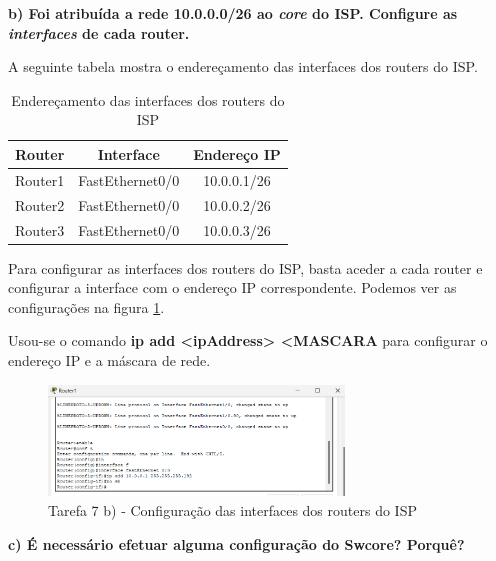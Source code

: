 \documentclass[11pt,english, openright, oneside]{book}
\begin{document}
\vspace{0.8cm}

\pagebreak
\textbf{b) Foi atribuída a rede 10.0.0.0/26 ao \textit{core} do ISP. Configure as \textit{interfaces} de cada router.}
\vspace{0.2cm}

A seguinte tabela mostra o endereçamento das interfaces dos routers do ISP.

\begin{table}[h!]
    \centering
    \begin{tabular}{|c|c|c|}
    \hline
        \textbf{Router} & \textbf{Interface} & \textbf{Endereço IP}\\
    \hline
        Router1 & FastEthernet0/0 & 10.0.0.1/26 \\
        Router2 & FastEthernet0/0 & 10.0.0.2/26 \\
        Router3 & FastEthernet0/0 & 10.0.0.3/26 \\
    \hline
    \end{tabular}
    \caption{Endereçamento das interfaces dos routers do ISP}
    \label{tab:ipISP}
\end{table}
\vspace{0.2cm}

Para configurar as interfaces dos routers do ISP, basta aceder a cada router e configurar a interface com o endereço IP correspondente. Podemos ver as configurações na figura \ref{fig:7.b}.
\par Usou-se o comando \textbf{ip add <ipAddress> <MASCARA} para configurar o endereço IP e a máscara de rede.
\vspace{0.2cm}

\begin{figure}[H]
    \centering
    \includegraphics[width=0.7\textwidth]{imagens/Tarefa7/7.b.png}
    \caption{Tarefa 7 b) - Configuração das interfaces dos routers do ISP}
    \label{fig:7.b}
\end{figure}


\vspace{0.8cm}

\pagebreak
\textbf{c) É necessário efetuar alguma configuração do Swcore? Porquê?}
\vspace{0.2cm}
\end{document}

